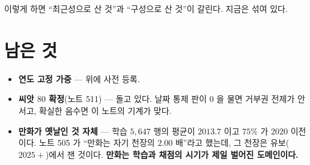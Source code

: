 \documentclass[11pt]{article}
\begin{document}
이렇게 하면 ``최근성으로 산 것''과 ``구성으로 산 것''이 갈린다. 지금은
섞여 있다.

\section*{남은 것}

\begin{itemize}
\item \textbf{연도 고정 가중} --- 위에 사전 등록.
\item \textbf{씨앗 $80$ 확정}(노트 511) --- 돌고 있다. 날짜 통제 판이
$0$ 을 물면 거부권 전제가 안 서고, 확실한 음수면 이 노트의 기계가 맞다.
\item \textbf{만화가 옛날인 것 자체} --- 학습 $5{,}647$ 행의 평균이
$2013.7$ 이고 $75\%$ 가 $2020$ 이전이다. 노트 505 가 ``만화는 자기 천장의
$2.00$ 배''라고 했는데, 그 천장은 유보($2025+$)에서 잰 것이다.
\textbf{만화는 학습과 채점의 시기가 제일 벌어진 도메인이다.}
\end{itemize}
\end{document}
